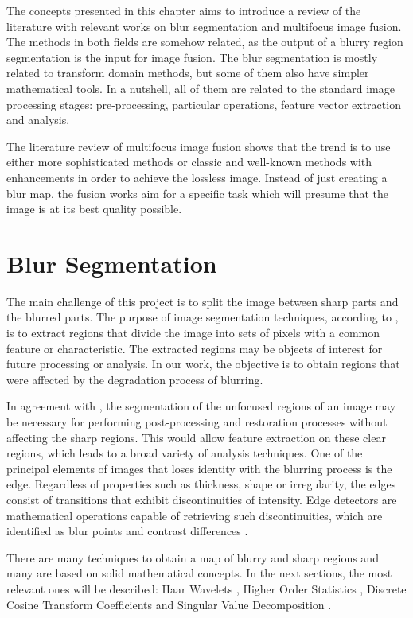 The concepts presented in this chapter aims to introduce a review of the literature with relevant works on blur segmentation and multifocus image fusion. The methods in both fields are somehow related, as the output of a blurry region segmentation is the input for image fusion. The blur segmentation is mostly related to transform domain methods, but some of them also have simpler mathematical tools. In a nutshell, all of them are related to the standard image processing stages: pre-processing, particular operations, feature vector extraction and analysis. 

The literature review of multifocus image fusion shows that the trend is to use either more sophisticated methods or classic and well-known methods with enhancements in order to achieve the lossless image. Instead of just creating a blur map, the fusion works aim for a specific task which will presume that the image is at its best quality possible. 

\section{Blur Segmentation}

The main challenge of this project is to split the image between sharp parts and the blurred parts. The purpose of image segmentation techniques, according to , is to extract regions that divide the image into sets of pixels with a common feature or characteristic. The extracted regions may be objects of interest for future processing or analysis. In our work, the objective is to obtain regions that were affected by the degradation process of blurring.

In agreement with , the segmentation of the unfocused regions of an image may be necessary for performing post-processing and restoration processes without affecting the sharp regions. This would allow feature extraction on these clear regions, which leads to a broad variety of analysis techniques. One of the principal elements of images that loses identity with the blurring process is the edge. Regardless of properties such as thickness, shape or irregularity, the edges consist of transitions that exhibit discontinuities of intensity. Edge detectors are mathematical operations capable of retrieving such discontinuities, which are identified as blur points and contrast differences \cite{barat2004segmentation}.

There are many techniques to obtain a map of blurry and sharp regions and many are based on solid mathematical concepts. In the next sections, the most relevant ones will be described: Haar Wavelets \cite{liang2017automatic}, Higher Order Statistics \cite{lee2014blurred}, Discrete Cosine Transform Coefficients \cite{taiebeh2017automatic} and Singular Value Decomposition \cite{su2011blurred}.

